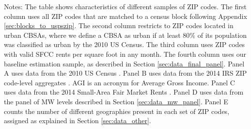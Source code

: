 \begin{landscape}
\begin{table}[hbt!]
    \begin{minipage}{.95\linewidth} \footnotesize
        \vspace{2mm}
        Notes: The table shows characteristics of different samples of ZIP codes.
        The first column uses all ZIP codes that are matched to a census block
        following Appendix \ref{sec:blocks_to_uspszip}.
        The second column restricts to ZIP codes located in urban CBSAs, where 
        we define a CBSA as urban if at least 80\% of its population was 
        classified as urban by the 2010 US Census.
        The third column uses ZIP codes with valid SFCC rents per square
        foot in any month.
        The fourth column uses our baseline estimation sample, as described in
        Section \ref{sec:data_final_panel}.
        Panel A uses data from the 2010 US Census \parencite{CensusDecennial}.
        Panel B uses data from the 2014 IRS ZIP code-level aggregates
        \parencite{IRS}. AGI is an acronym for Average Gross Income.
        Panel C uses data from the 2014 Small-Area Fair Market 
        Rents \parencite[SAFMR;][]{hudSAFMR}.
        Panel D uses data from the panel of MW levels
        described in Section \ref{sec:data_mw_panel}.
        Panel E counts the number of different geographies present in each set
        of ZIP codes, assigned as explained in Section \ref{sec:data_other}.
    \end{minipage}
\end{table}
\end{landscape}
